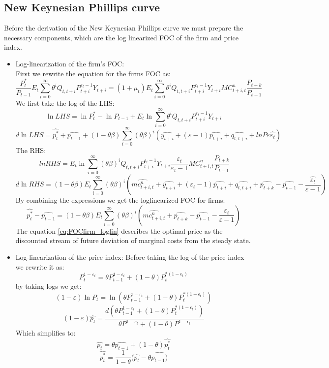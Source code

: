 \documentclass[10pt,a4paper]{article}
\begin{document}
\subsection{New Keynesian Phillips curve}
Before the derivation of the New Keynesian Phillips curve we must prepare the necessary components, which are the log linearized FOC of the firm and price index.
\begin{itemize}
\item Log-linearization of the firm's FOC:
\\First we rewrite the equation for the firms FOC as:
$$ \frac{P_t^*}{P_{t-1}}E_t\sum_{i=0}^{\infty} \theta^iQ_{t,t+i}P_{t+i}^{\varepsilon_t-1}Y_{t+i}
 = (1+\mu_t) E_t \sum_{i=0}^{\infty} \theta^iQ_{t,t+i}P_{t+i}^{\varepsilon_t-1}Y_{t+i} MC_{t+i,t}^n\frac{P_{t+k}}{P_{t-1}}$$
We first take the log of the LHS:
$$\ln LHS = \ln P_t^* - \ln P_{t-1} + E_t \ln \sum_{i=0}^{\infty} \theta^iQ_{t,t+i}P_{t+i}^{\varepsilon_t-1}Y_{t+i}$$
$$ d\ln LHS = \hat{p_t^*} + \hat{p_{t-1}} +(1-\theta\beta)\sum_{i=0}^{\infty}(\theta\beta)^i(\hat{y_{t+i}}+(\varepsilon-1)\hat{p_{t+i}}+\hat{q_{t,t+i}} +lnP\varepsilon\hat{\varepsilon_t})$$
The RHS:
$$\ ln RHS = E_t \ln \sum_{i=0}^{\infty} (\theta\beta)^iQ_{t,t+i}P_{t+i}^{\varepsilon_t-1}Y_{t+i}\frac{\varepsilon_t}{\varepsilon_t-1} MC_{t+i,t} ^n\frac{P_{t+k}}{P_{t-1}}$$
$$ d \ln RHS = (1-\theta\beta) E_t \sum_{i=0}^{\infty} (\theta\beta)^i(\hat{mc_{t+i,t}^n}+\hat{y_{t+i}}+(\varepsilon_t-1)\hat{p_{t+i}}+\hat{q_{t,t+i}} + \hat{p_{t+k}} - \hat{p_{t-1}}-\frac{\hat{\varepsilon_t}}{\varepsilon-1})$$
By combining the expressions we get the loglinearized FOC for firms:
\begin{equation}\label{eq:FOCfirm_loglin}
\hat{p_t^*} - \hat{p_{t-1}} 
= (1-\theta\beta) E_t \sum_{i=0}^{\infty} (\theta\beta)^i\left( \hat{mc_{t+i,t}^n} + \hat{p_{t+k}} - \hat{p_{t-1}} -\frac{\hat{\varepsilon_t}}{\varepsilon-1} \right)
\end{equation}
The equation \eqref{eq:FOCfirm_loglin} describes the optimal price as the discounted stream of future deviation of marginal costs from the steady state.
\item Log-linearization of the price index:
Before taking the log of the price index we rewrite it as:
$$P_t^{1-\varepsilon_t} =\theta P_{t-1}^{1-\epsilon_t} + (1-\theta)P_t^{*(1-\epsilon_t)}$$
by taking logs we get:
$$(1-\varepsilon) \ln P_t = \ln (\theta P_{t-1}^{1-\epsilon_t} + (1-\theta) P_t^{*(1-\epsilon_t)})$$
$$(1-\varepsilon)\hat{p_t}=\frac
{d(\theta P_{t-1}^{1-\varepsilon_t} + (1-\theta)P_t^{*(1-\epsilon_t)})}
{\theta	P^{1-\varepsilon_t} + (1-\theta) P^{1-\epsilon_t}}$$
Which simplifies to:
\begin{equation*}
\hat{p_t}=\theta\hat{p_{t-1}}+(1-\theta)\hat{p_t^*}
\end{equation*}
\begin{equation}\label{eq:priceIndex_loglin}
\hat{p_t^*}=\frac{1}{1-\theta}(\hat{p_t}-\theta\hat{p_{t-1})}
\end{equation}
\end{itemize}
\end{document}

